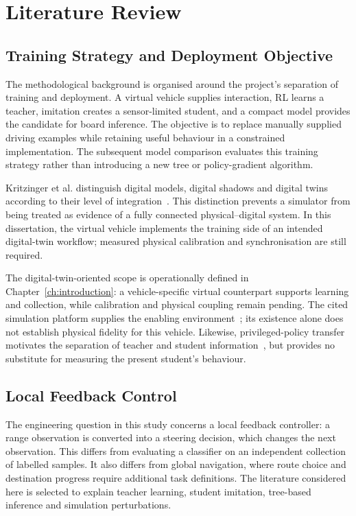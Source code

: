 \chapter{Literature Review}
\label{ch:literature}
\section{Training Strategy and Deployment Objective}
The methodological background is organised around the project's separation of
training and deployment. A virtual vehicle supplies interaction, RL learns a
teacher, imitation creates a sensor-limited student, and a compact model provides
the candidate for board inference. The objective is to replace manually supplied
driving examples while retaining useful behaviour in a constrained implementation.
The subsequent model comparison evaluates this training strategy rather than
introducing a new tree or policy-gradient algorithm.

Kritzinger et al. distinguish digital models, digital shadows and digital twins
according to their level of integration~\cite{kritzinger2018digital}. This
distinction prevents a simulator from being treated as evidence of a fully
connected physical--digital system. In this dissertation, the virtual vehicle
implements the training side of an intended digital-twin workflow; measured
physical calibration and synchronisation are still required.

The digital-twin-oriented scope is operationally defined in
Chapter~\ref{ch:introduction}: a vehicle-specific virtual counterpart supports
learning and collection, while calibration and physical coupling remain pending.
The cited simulation platform supplies the enabling environment~\cite{koenig2004gazebo};
its existence alone does not establish physical fidelity for this vehicle.
Likewise, privileged-policy transfer motivates the separation of teacher and
student information~\cite{chen2019cheating}, but provides no substitute for
measuring the present student's behaviour.

\section{Local Feedback Control}
The engineering question in this study concerns a local feedback controller:
a range observation is converted into a steering decision, which changes the
next observation. This differs from evaluating a classifier on an independent
collection of labelled samples. It also differs from global navigation, where
route choice and destination progress require additional task definitions.
The literature considered here is selected to explain teacher learning,
student imitation, tree-based inference and simulation perturbations.

